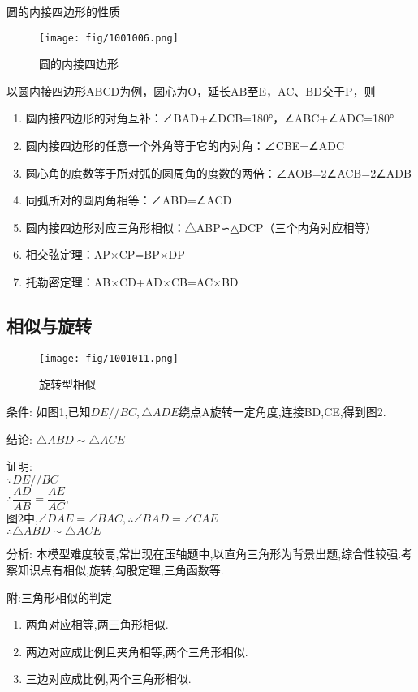 \documentclass[cn,blue,10pt]{elegantbook}
\begin{document}
圆的内接四边形的性质
\begin{figure}[H]
    \centering
    \texttt{[image: fig/1001006.png]}
    \caption{圆的内接四边形}%
    \label{fig:fig/}
\end{figure}
以圆内接四边形ABCD为例，圆心为O，延长AB至E，AC、BD交于P，则
\begin{enumerate}
    \item 圆内接四边形的对角互补：∠BAD+∠DCB=180°，∠ABC+∠ADC=180°
    \item 圆内接四边形的任意一个外角等于它的内对角：∠CBE=∠ADC
    \item 圆心角的度数等于所对弧的圆周角的度数的两倍：∠AOB=2∠ACB=2∠ADB
    \item 同弧所对的圆周角相等：∠ABD=∠ACD
    \item 圆内接四边形对应三角形相似：△ABP∽△DCP（三个内角对应相等）
    \item 相交弦定理：AP×CP=BP×DP
    \item 托勒密定理：AB×CD+AD×CB=AC×BD
\end{enumerate}

\subsection{相似与旋转}%
\label{sub:相似与旋转}

\begin{figure}[h]
    \centering
    \texttt{[image: fig/1001011.png]}
    \caption{旋转型相似}%
    \label{fig:倒数型相似}
\end{figure}
条件: 如图1,已知\(DE // BC,\triangle ADE\)绕点A旋转一定角度,连接BD,CE,得到图2.

结论: \(\triangle ABD \sim \triangle ACE\) 

证明:\\
\(\because  DE // BC\) \\
\(\therefore \dfrac{AD}{AB}=\dfrac{AE}{AC},\) \\
图2中,\(\angle DAE = \angle BAC,\therefore \angle BAD=\angle CAE\) \\
\(\therefore \triangle ABD \sim \triangle ACE\)

分析: 本模型难度较高,常出现在压轴题中,以直角三角形为背景出题,综合性较强.考察知识点有相似,旋转,勾股定理,三角函数等.

附:三角形相似的判定
\begin{enumerate}
    \item 两角对应相等,两三角形相似.
    \item 两边对应成比例且夹角相等,两个三角形相似. 
    \item 三边对应成比例,两个三角形相似.
\end{enumerate}
\end{document}
